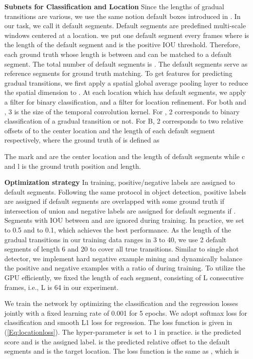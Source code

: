\documentclass[runningheads]{llncs}
\begin{document}
\textbf{Subnets for Classification and Location} Since the lengths of gradual transitions are various, we use the same notion default boxes introduced in \cite{liu2016ssd}. In our task, we call it default segments. Default segments are predefined multi-scale windows centered at a location. we put one default segment every  frames where  is the length of the default segment and  is the positive IOU threshold. Therefore, each ground truth whose length is between  and  can be matched to a default segment. The total number of default segments is . The default segments serve as reference segments for ground truth matching. To get features for predicting gradual transitions, we first apply a spatial global average pooling layer to reduce the spatial dimension to .  At each location which has  default segments, we apply a  filter  for binary classification, and a  filter  for location refinement. For both  and , 3 is the size of the temporal convolution kernel. For , 2 corresponds to binary classification of a gradual transition or not. For B, 2 corresponds to two relative offsets of  to the center location and the length of each default segment respectively, where the ground truth of  is defined as

The mark  and  are the center location and the length of default segments while c and l is the ground truth position and length.

\textbf{Optimization strategy} In training, positive/negative labels are assigned to default segments. Following the same protocol in object detection, positive labels are assigned if default segments are overlapped with some ground truth if intersection of union  and negative labels are assigned for default segments if . Segments with IOU between  and  are ignored during training. In practice, we set  to 0.5  and  to 0.1, which achieves the best performance. As the length of the gradual transitions in our training data ranges in 3 to 40, we use 2 default segments of length 6 and 20 to cover all true transitions. Similar to single shot detector, we implement hard negative example mining and dynamically balance the positive and negative examples with a ratio of  during training. To utilize the GPU efficiently, we fixed the length of each segment, consisting of L consecutive frames, i.e., L is 64 in our experiment.

We train the network by optimizing the classification and the regression losses jointly with a fixed learning rate of 0.001 for 5 epochs. We adopt softmax loss for classification and smooth L1 loss for regression. The loss function is given in (\ref{Eq:locationloss}). The hyper-parameter  is set to 1 in practice.  is the predicted score and  is the assigned label.  is the predicted relative offset to the default segments and  is the target location. The loss function is the same as \cite{liu2016ssd}, which is
\end{document}
